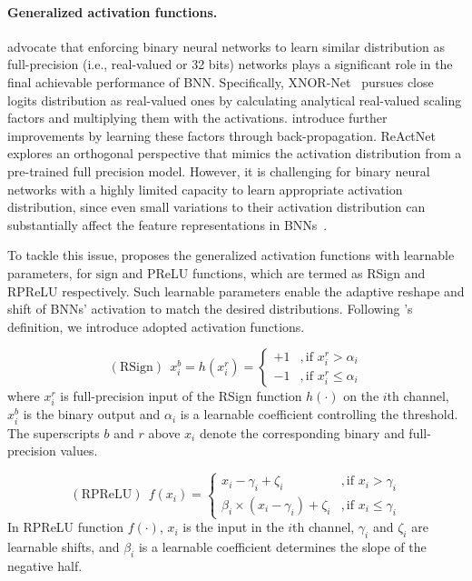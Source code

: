 \documentclass[final]{cvpr}
\begin{document}
\paragraph{Generalized activation functions.} \cite{rastegari2016xnor,xu2019accurate,bulat2019xnor,liu2020reactnet} advocate that enforcing binary neural networks to learn similar distribution as full-precision (i.e., real-valued or 32 bits) networks plays a significant role in the final achievable performance of BNN. Specifically, XNOR-Net~\cite{rastegari2016xnor} pursues close logits distribution as real-valued ones by calculating analytical real-valued scaling factors and multiplying them with the activations. \cite{xu2019accurate,bulat2019xnor} introduce further improvements by learning these factors through back-propagation. ReActNet~\cite{liu2020reactnet} explores an orthogonal perspective that mimics the activation distribution from a pre-trained full precision model. However, it is challenging for binary neural networks with a highly limited capacity to learn appropriate activation distribution, since even small variations to their activation distribution can substantially affect the feature representations in BNNs~\cite{liu2020reactnet}.

To tackle this issue, \cite{liu2020reactnet} proposes the generalized activation functions with learnable parameters, for $\mathrm{sign}$ and PReLU \cite{he2015delving} functions, which are termed as RSign and RPReLU respectively. Such learnable parameters enable the adaptive reshape and shift of BNNs' activation to match the desired distributions. Following \cite{liu2020reactnet}'s definition, we introduce adopted activation functions.

\begin{equation}
\mathrm{(RSign)}\ \  x_i^{b}=h(x_i^{r})=\left\{
\begin{aligned}
+1 & , \text{if } x_i^{r} > \alpha_i \\
-1 & , \text{if } x_i^{r} \leq \alpha_i
\end{aligned}
\right.
\end{equation}
where $x_i^{r}$ is full-precision input of the RSign function $h(\cdot)$ on the $i$th channel, $x_i^{b}$ is the binary output and $\alpha_i$ is a learnable coefficient controlling the threshold. The superscripts $b$ and $r$ above $x_i$ denote the corresponding binary and full-precision values.

\begin{equation}
\mathrm{(RPReLU)}\ \ f(x_i)=\left\{
\begin{aligned}
x_i- \gamma_i + \zeta_i & , \text{if } x_i > \gamma_i \\
\beta_i \times (x_i - \gamma_i) + \zeta_i & , \text{if } x_i \leq \gamma_i
\end{aligned}
\right.
\end{equation}
In RPReLU function $f(\cdot)$, $x_i$ is the input in the $i$th channel, $\gamma_i$ and $\zeta_i$ are learnable shifts, and $\beta_i$ is a learnable coefficient determines the slope of the negative half.
\end{document}
